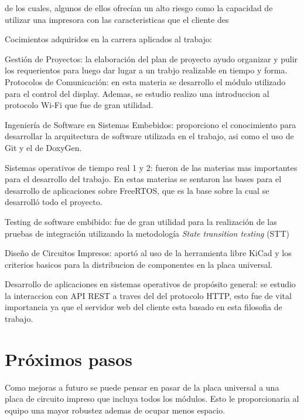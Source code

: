 de los cuales, algunos de ellos ofrecían un alto riesgo como la capacidad de utilizar una impresora con las caracteristicas que el cliente des


Cocimientos adquiridos en la carrera aplicados al trabajo:

Gestión de Proyectos: la elaboración del plan de proyecto ayudo organizar y pulir los requerientos para luego dar lugar a un trabjo realizable en tiempo y forma.
Protocolos de Comunicación: en esta materia se desarrollo el módulo utilizado para el control del display. Ademas, se estudio realizo una introduccion al protocolo Wi-Fi que fue de gran utilidad.

Ingeniería de Software en Sistemas Embebidos: proporciono el conocimiento para desarrollar la arquitectura de software utilizada en el trabajo, asi como el uso de Git y el de DoxyGen.

Sistemas operativos de tiempo real 1 y 2: fueron de las materias mas importantes para el desarrollo del trabajo. En estas materias se sentaron las bases para el desarrollo de aplicaciones sobre FreeRTOS, que es la base sobre la cual se desarrolló todo el proyecto.

Testing de software embibido: fue de gran utilidad para la realización de las pruebas de integración utilizando la metodología \textit{State transition testing} (STT)

Diseño de Circuitos Impresos: aportó al uso de la herramienta libre KiCad y los criterios basicos para la distribucion de componentes en la placa universal.

Desarrollo de aplicaciones en sistemas operativos de propósito general: se estudio la interaccion con API REST a traves del del protocolo HTTP, esto fue de vital importancia ya que el servidor web del cliente esta basado en esta filosofia de trabajo.

\section{Próximos pasos}

Como mejoras a futuro se puede pensar en pasar de la placa universal a una placa de circuito impreso que incluya todos los módulos. Esto le proporcionaria al equipo una mayor robustez ademas de ocupar menos espacio.
